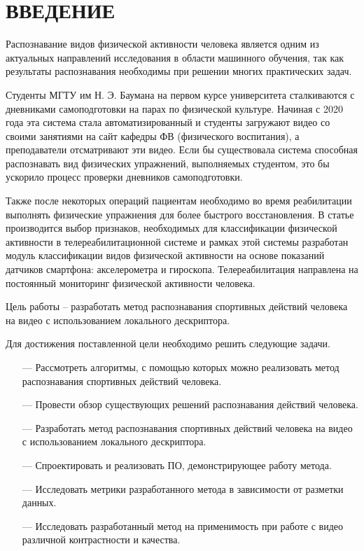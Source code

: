 \chapter*{ВВЕДЕНИЕ}

Распознавание видов физической активности человека является одним из актуальных направлений исследования в области машинного обучения, так как результаты распознавания необходимы при решении многих практических задач.

Студенты МГТУ им Н. Э. Баумана на первом курсе университета сталкиваются с дневниками самоподготовки на парах по физической культуре. Начиная с 2020 года эта система стала автоматизированный и студенты загружают видео со своими занятиями на сайт кафедры ФВ (физического воспитания), а преподаватели отсматривают эти видео. Если бы существовала система способная распознавать вид физических упражнений, выполняемых студентом, это бы ускорило процесс проверки дневников самоподготовки.

Также после некоторых операций пациентам необходимо во время реабилитации выполнять физические упражнения для более быстрого восстановления. В статье  \cite{med} производится выбор признаков, необходимых для классификации физической активности в телереабилитационной системе и рамках
этой системы разработан модуль классификации
видов физической активности на основе показаний датчиков
смартфона: акселерометра и гироскопа. Телереабилитация направлена на постоянный мониторинг физической активности человека.  

Цель работы -- разработать метод распознавания спортивных действий человека на видео с использованием локального дескриптора.

Для достижения поставленной цели необходимо решить следующие
задачи.
\begin{itemize}
	\item[---] Рассмотреть алгоритмы, с помощью которых можно реализовать метод распознавания спортивных действий человека.
	\item[---] Провести обзор существующих решений распознавания действий человека.
	\item[---] Разработать метод распознавания спортивных действий человека на видео с использованием локального дескриптора.
	\item[---] Спроектировать и реализовать ПО, демонстрирующее работу метода.
	\item[---] Исследовать метрики разработанного метода в зависимости от разметки данных.
	\item[---] Исследовать разработанный метод на применимость при работе с видео различной контрастности и качества.	
\end{itemize}
